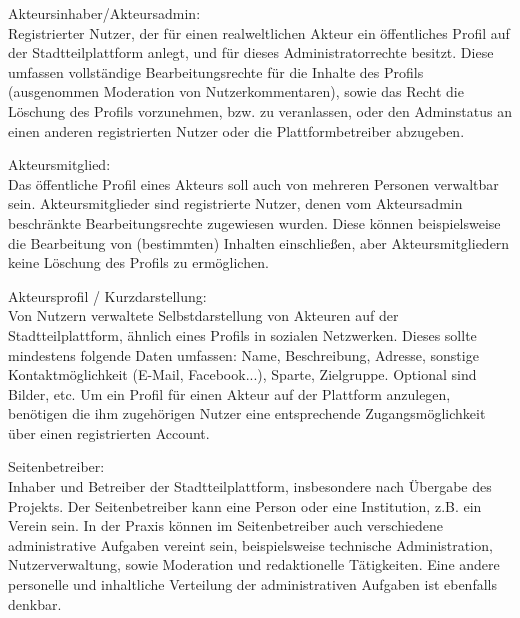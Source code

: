 \documentclass{swp}
\begin{document}
Akteursinhaber/Akteursadmin:\\Registrierter Nutzer, der f\"ur einen realweltlichen Akteur ein \"offentliches Profil auf der Stadtteilplattform anlegt, und f\"ur dieses Administratorrechte besitzt. Diese umfassen vollst\"andige Bearbeitungsrechte f\"ur die Inhalte des Profils (ausgenommen Moderation von Nutzerkommentaren), sowie das Recht die L\"oschung des Profils vorzunehmen, bzw. zu veranlassen, oder den Adminstatus an einen anderen registrierten Nutzer oder die Plattformbetreiber abzugeben.

Akteursmitglied:\\Das \"offentliche Profil eines Akteurs soll auch von mehreren Personen verwaltbar sein. Akteursmitglieder sind registrierte Nutzer, denen vom Akteursadmin beschr\"ankte Bearbeitungsrechte zugewiesen wurden. Diese k\"onnen beispielsweise die Bearbeitung von (bestimmten) Inhalten einschlie{\ss}en, aber Akteursmitgliedern keine L\"oschung des Profils zu erm\"oglichen.

Akteursprofil / Kurzdarstellung:\\Von Nutzern verwaltete Selbstdarstellung von Akteuren auf der Stadtteilplattform, \"ahnlich eines Profils in sozialen Netzwerken. Dieses sollte mindestens folgende Daten umfassen: Name, Beschreibung, Adresse, sonstige Kontaktm\"oglichkeit (E-Mail, Facebook...), Sparte, Zielgruppe. Optional sind Bilder, etc. Um ein Profil f\"ur einen Akteur auf der Plattform anzulegen, ben\"otigen die ihm zugeh\"origen Nutzer eine entsprechende Zugangsm\"oglichkeit \"uber einen registrierten Account.

Seitenbetreiber:\\Inhaber und Betreiber der Stadtteilplattform, insbesondere nach \"Ubergabe des Projekts. Der Seitenbetreiber kann eine Person oder eine Institution, z.B. ein Verein sein. In der Praxis k\"onnen im Seitenbetreiber auch verschiedene administrative Aufgaben vereint sein, beispielsweise technische Administration, Nutzerverwaltung, sowie Moderation und redaktionelle T\"atigkeiten. Eine andere personelle und inhaltliche Verteilung der administrativen Aufgaben ist ebenfalls denkbar.
\end{document}
